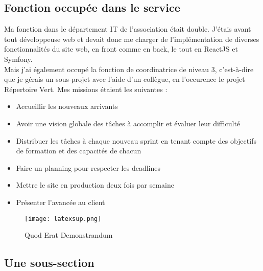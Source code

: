 \subsection{Fonction occupée dans le service}
Ma fonction dans le département IT de l'association était double. 
J'étais avant tout développeuse web et devait donc me charger de l'implémentation de diverses fonctionnalités du site web, en front comme en back, le tout en ReactJS et Symfony.
\\
Mais j'ai également occupé la fonction de coordinatrice de niveau 3, 
c'est-à-dire que je gérais un sous-projet avec l'aide d'un collègue, en l'occurence le projet Répertoire Vert. Mes missions étaient les suivantes :
\begin{itemize}
    \item Accueillir les nouveaux arrivants
    \item Avoir une vision globale des tâches à accomplir et évaluer leur difficulté
    \item Distribuer les tâches à chaque nouveau sprint en tenant compte des objectifs de formation et des capacités de chacun
    \item Faire un planning pour respecter les deadlines
    \item Mettre le site en production deux fois par semaine
    \item Présenter l'avancée au client
\end{itemize}



\begin{figure}[H]
    \centering
    \texttt{[image: latexsup.png]}
    \caption{Quod Erat Demonstrandum}
\end{figure}

\FloatBarrier

\clearpage

\subsection{Une sous-section}

